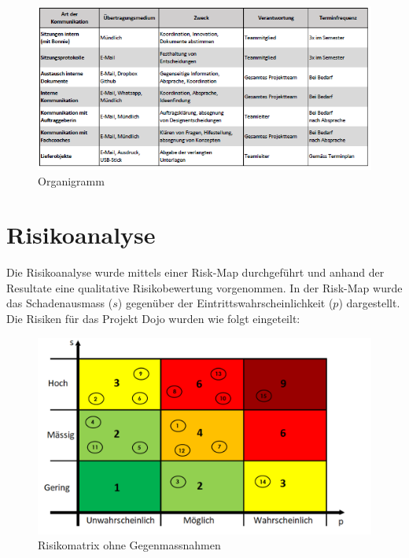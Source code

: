 \documentclass[10pt,a4paper,oneside]{99_fhnwreport}
\begin{document}
\begin{figure}[htbp]
	\centering
	\includegraphics[width=13.5cm]{Kommunikationskonzept.png}
		\caption{Organigramm}
\end{figure}
\section{Risikoanalyse}\label{sec:risikoanalyse}
Die Risikoanalyse wurde mittels einer Risk-Map durchgeführt und anhand der Resultate eine qualitative Risikobewertung vorgenommen. In der Risk-Map wurde das Schadenausmass ($s$) gegenüber der Eintrittswahrscheinlichkeit ($p$) dargestellt.\\

Die Risiken für das Projekt Dojo wurden wie folgt eingeteilt:

\begin{figure}[htbp]
	\centering
	\includegraphics[width=13.5cm]{risiko1.png}
		\caption{Risikomatrix ohne Gegenmassnahmen}
\end{figure}
\end{document}
